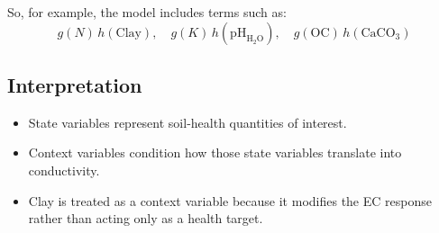 \documentclass[11pt]{article}
\begin{document}
So, for example, the model includes terms such as:
\[
g(N)\,h(\mathrm{Clay}),\quad
g(K)\,h(\mathrm{pH}_{\mathrm{H_2O}}),\quad
g(\mathrm{OC})\,h(\mathrm{CaCO_3})
\]

\subsection*{Interpretation}
\begin{itemize}[leftmargin=1.5em]
\item State variables represent soil-health quantities of interest.
\item Context variables condition how those state variables translate into conductivity.
\item Clay is treated as a context variable because it modifies the EC response rather than acting only as a health target.
\end{itemize}
\end{document}
